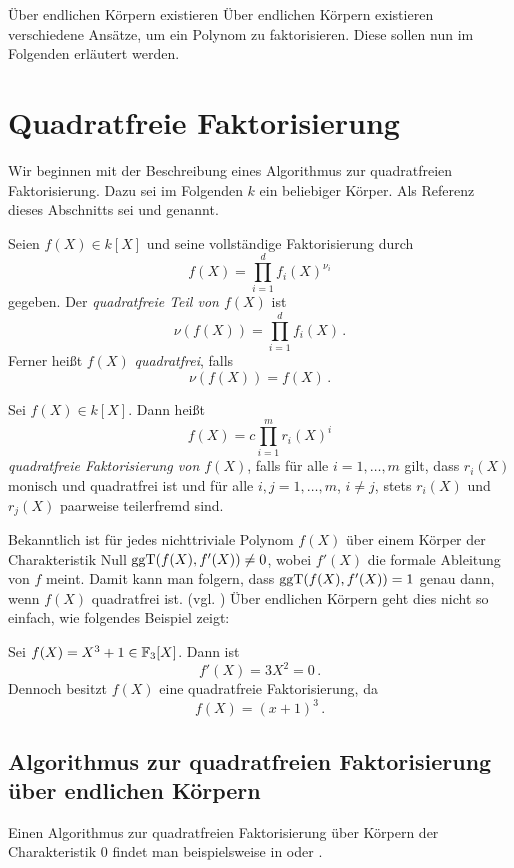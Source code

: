 Über endlichen Körpern existieren Über endlichen Körpern existieren 
verschiedene Ansätze, um ein Polynom zu faktorisieren. Diese sollen nun im
Folgenden erläutert werden.

\section{Quadratfreie Faktorisierung}
Wir beginnen mit der Beschreibung eines Algorithmus zur quadratfreien 
Faktorisierung. Dazu sei im Folgenden $k$ ein beliebiger Körper. 
Als Referenz dieses Abschnitts sei 
\autocite[Section 9]{cohan:algebra} und \autocite[Section
8.3]{geddes:algorithms} genannt.


\begin{definition}
  Seien $f(X) \in k[X]$ und seine vollständige Faktorisierung durch
  \[ f(X) = \prod_{i=1}^d f_i(X)^{\nu_i}\]
  gegeben. Der \emph{quadratfreie Teil von $f(X)$} ist
  \[ \nu(f(X)) = \prod_{i=1}^d f_i(X) \,.\]
  Ferner heißt $f(X)$ \emph{quadratfrei}, falls
  \[\nu(f(X)) = f(X)\,.\]
\end{definition}

\begin{definition}
  Sei $f(X) \in k[X]$. Dann heißt
  \[ f(X) = c \prod_{i=1}^m r_i(X)^i\]
  \emph{quadratfreie Faktorisierung von $f(X)$}, falls
  für alle $i=1,\ldots,m$ gilt, dass $r_i(X)$ monisch und quadratfrei ist und
  für alle $i,j=1,\ldots,m$, $i\neq j$, stets $r_i(X)$ und $r_j(X)$ paarweise
  teilerfremd sind.
\end{definition}

Bekanntlich ist für jedes nichttriviale Polynom $f(X)$ über einem Körper der
Charakteristik Null $\operatorname{ggT}(f(X),f'(X)) \neq 0$, wobei $f'(X)$ die formale
Ableitung von $f$ meint. Damit kann man folgern, dass $\operatorname{ggT}(f(X),f'(X)) = 1$
genau dann, wenn $f(X)$ quadratfrei ist. (vgl. \autocites[Theorem
9.4]{cohan:algebra}[Theorem 9.5]{cohan:algebra}) Über endlichen Körpern geht
dies nicht so einfach, wie folgendes Beispiel zeigt:

\begin{beispiel}
  Sei $f(X) = X^3+1 \in \mathbb{F}_3[X]$. Dann ist 
  \[ f'(X) = 3 X^2 = 0 \,. \]
  Dennoch besitzt $f(X)$ eine quadratfreie Faktorisierung, da
  \[ f(X) = (x+1)^3\,.\]
\end{beispiel}


\subsection{Algorithmus zur quadratfreien Faktorisierung über endlichen
Körpern}
Einen Algorithmus zur quadratfreien Faktorisierung über Körpern der
Charakteristik $0$ findet man beispielsweise in \autocite[Figure 9.1]{cohen:algebra}
oder \autocite[Algorithm 8.1]{geddes:algorithms}.

